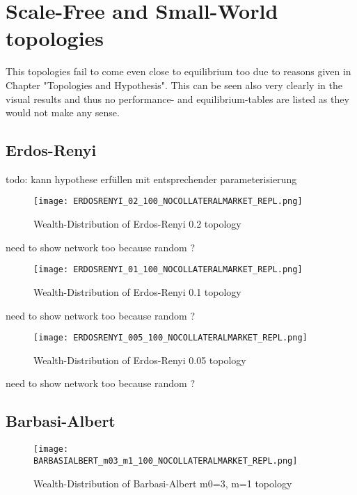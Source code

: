 \documentclass[Bachelorarbeit.tex]{subfiles}
\begin{document}
\section{Scale-Free and Small-World topologies}
This topologies fail to come even close to equilibrium too due to reasons given in Chapter "Topologies and Hypothesis". This can be seen also very clearly in the visual results and thus no performance- and equilibrium-tables are listed as they would not make any sense.

\subsection{Erdos-Renyi}
todo: kann hypothese erfüllen mit entsprechender parameterisierung

\begin{figure}[H]
	\centering
  \texttt{[image: ERDOSRENYI\_02\_100\_NOCOLLATERALMARKET\_REPL.png]}
	\caption{Wealth-Distribution of Erdos-Renyi 0.2 topology}
	\label{fig:wealth_ERDOSRENYI_02_100_NOCOLLATERALMARKET_REPL}
\end{figure}

need to show network too because random ?

\begin{figure}[H]
	\centering
  \texttt{[image: ERDOSRENYI\_01\_100\_NOCOLLATERALMARKET\_REPL.png]}
	\caption{Wealth-Distribution of Erdos-Renyi 0.1 topology}
	\label{fig:wealth_ERDOSRENYI_01_100_NOCOLLATERALMARKET_REPL}
\end{figure}

need to show network too because random ?

\begin{figure}[H]
	\centering
  \texttt{[image: ERDOSRENYI\_005\_100\_NOCOLLATERALMARKET\_REPL.png]}
	\caption{Wealth-Distribution of Erdos-Renyi 0.05 topology}
	\label{fig:wealth_ERDOSRENYI_005_100_NOCOLLATERALMARKET_REPL}
\end{figure}

need to show network too because random ?

\subsection{Barbasi-Albert}
\begin{figure}[H]
	\centering
  \texttt{[image: BARBASIALBERT\_m03\_m1\_100\_NOCOLLATERALMARKET\_REPL.png]}
	\caption{Wealth-Distribution of Barbasi-Albert m0=3, m=1 topology}
	\label{fig:wealth_BARBASIALBERT_m03_m1_100_NOCOLLATERALMARKET_REPL}
\end{figure}
\end{document}
